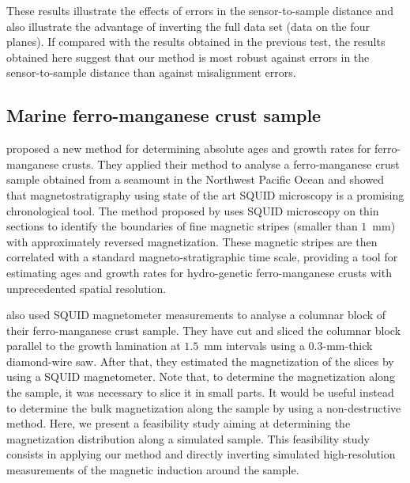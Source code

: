 \documentclass[draft,gc]{agutex}
\begin{document}
\begin{article}
These results illustrate the effects of errors in the sensor-to-sample
distance and also illustrate the advantage of inverting the full data set 
(data on the four planes).
If compared with the results obtained in the previous test, 
the results obtained here suggest that our method is most robust against errors in
the sensor-to-sample distance than against misalignment errors.

\subsection{Marine ferro-manganese crust sample}
\label{subsec:Marine ferro-manganese crust sample}


\citet{oda2011} proposed a new method for determining absolute 
ages and growth rates for ferro-manganese crusts.
They applied their method to analyse a ferro-manganese crust sample 
obtained from a seamount in the Northwest Pacific Ocean and
showed that magnetostratigraphy using state of the art SQUID
microscopy is a promising chronological tool.
The method proposed by \citet{oda2011} uses SQUID microscopy 
on thin sections to identify the boundaries of fine magnetic stripes 
(smaller than $1$~mm) with approximately reversed magnetization. 
These magnetic stripes are then correlated with a standard 
magneto-stratigraphic time scale, providing a tool for 
estimating ages and growth rates for hydro-genetic 
ferro-manganese crusts with unprecedented 
spatial resolution.

\citet{oda2011} also used SQUID magnetometer measurements
to analyse a columnar block of their ferro-manganese crust sample.
They have cut and sliced the columnar block parallel to the growth 
lamination at $1.5$~mm intervals using a $0.3$-mm-thick diamond-wire 
saw. After that, they estimated the magnetization of the slices by 
using a SQUID magnetometer.
Note that, to determine the magnetization along the sample, 
it was necessary to slice it in small parts. It would be useful instead 
to determine the bulk magnetization along 
the sample by using a non-destructive method.
Here, we present a feasibility study aiming at  
determining the magnetization distribution along a simulated sample.
This feasibility study consists in applying our method and 
directly inverting simulated high-resolution measurements of 
the magnetic induction around the sample. 


\end{article}
\end{document}
